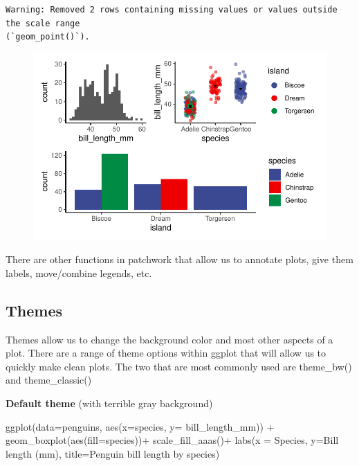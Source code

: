 \documentclass[
  letterpaper,
  DIV=11,
  numbers=noendperiod]{scrartcl}
\newenvironment{Shaded}{\begin{snugshade}}{\end{snugshade}}
\newcommand{\AttributeTok}[1]{\textcolor[rgb]{0.40,0.45,0.13}{#1}}
\newcommand{\FunctionTok}[1]{\textcolor[rgb]{0.28,0.35,0.67}{#1}}
\newcommand{\NormalTok}[1]{\textcolor[rgb]{0.00,0.23,0.31}{#1}}
\newcommand{\SpecialCharTok}[1]{\textcolor[rgb]{0.37,0.37,0.37}{#1}}
\newcommand{\StringTok}[1]{\textcolor[rgb]{0.13,0.47,0.30}{#1}}
\begin{document}
\begin{verbatim}
Warning: Removed 2 rows containing missing values or values outside the scale range
(`geom_point()`).
\end{verbatim}

\begin{figure}[H]

{\centering \includegraphics{Lab_2_files/figure-pdf/unnamed-chunk-40-1.pdf}

}

\end{figure}

There are other functions in patchwork that allow us to annotate plots,
give them labels, move/combine legends, etc.

\subsection{\texorpdfstring{\textbf{Themes}}{Themes}}

Themes allow us to change the background color and most other aspects of
a plot. There are a range of theme options within ggplot that will allow
us to quickly make clean plots. The two that are most commonly used are
theme\_bw() and theme\_classic()

\textbf{Default theme} (with terrible gray background)

\begin{Shaded}
\begin{Highlighting}[]
\FunctionTok{ggplot}\NormalTok{(}\AttributeTok{data=}\NormalTok{penguins, }\FunctionTok{aes}\NormalTok{(}\AttributeTok{x=}\NormalTok{species, }\AttributeTok{y=}\NormalTok{ bill\_length\_mm)) }\SpecialCharTok{+}
  \FunctionTok{geom\_boxplot}\NormalTok{(}\FunctionTok{aes}\NormalTok{(}\AttributeTok{fill=}\NormalTok{species))}\SpecialCharTok{+}
  \FunctionTok{scale\_fill\_aaas}\NormalTok{()}\SpecialCharTok{+}
  \FunctionTok{labs}\NormalTok{(}\AttributeTok{x =} \StringTok{\textquotesingle{}Species\textquotesingle{}}\NormalTok{, }\AttributeTok{y=}\StringTok{\textquotesingle{}Bill length (mm)\textquotesingle{}}\NormalTok{, }\AttributeTok{title=}\StringTok{\textquotesingle{}Penguin bill length by species\textquotesingle{}}\NormalTok{)}
\end{Highlighting}
\end{Shaded}
\end{document}
